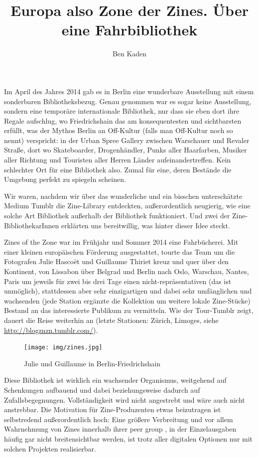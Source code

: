 \documentclass[a4paper,
fontsize=11pt,
oneside,
numbers=noperiodatend,
parskip=half-,
bibliography=totoc,
final
]{scrartcl}
\title{\LARGE{Europa also Zone der Zines. Über eine Fahrbibliothek}} %
\author{Ben Kaden} %
\date{}
\begin{document}
\maketitle
\thispagestyle{fancyplain} 


Im April des Jahres 2014 gab es in Berlin eine wunderbare Ausstellung
mit einem sonderbaren Bibliotheksbezug. Genau genommen war es sogar
keine Ausstellung, sondern eine temporäre internationale Bibliothek, nur
dass sie eben dort ihre Regale aufschlug, wo Friedrichshain das am
konsequentesten und sichtbarsten erfüllt, was der Mythos Berlin an
Off-Kultur (falls man Off-Kultur noch so nennt) verspricht: in der Urban
Spree Gallery zwischen Warschauer und Revaler Straße, dort wo
Skateboarder, Drogenhändler, Punks aller Haarfarben, Musiker aller
Richtung und Touristen aller Herren Länder aufeinandertreffen. Kein
schlechter Ort für eine Bibliothek also. Zumal für eine, deren Bestände
die Umgebung perfekt zu spiegeln scheinen.

Wir waren, nachdem wir über das wunderliche und ein bisschen
unterschätzte Medium Tumblr die Zine-Library entdeckten, außerordentlich
neugierig, wie eine solche Art Bibliothek außerhalb der Bibliothek
funktioniert. Und zwei der Zine-BibliothekarInnen erklärten uns
bereitwillig, was hinter dieser Idee steckt.

Zines of the Zone war im Frühjahr und Sommer 2014 eine Fahrbücherei. Mit
einer kleinen europäischen Förderung ausgestattet, tourte das Team um
die Fotografen Julie Hascoët und Guillaume Thiriet kreuz und quer über
den Kontinent, von Lissabon über Belgrad und Berlin nach Oslo, Warschau,
Nantes, Paris um jeweils für zwei bis drei Tage einen
nicht-repräsentativen (das ist unmöglich), stattdessen aber sehr
einzigartigen und dabei sehr umfänglichen und wachsenden (jede Station
ergänzte die Kollektion um weitere lokale Zine-Stücke) Bestand an das
interessierte Publikum zu vermitteln. Wie der Tour-Tumblr zeigt, dauert
die Reise weiterhin an (letzte Stationen: Zürich, Limoges, siehe
\url{http://blogznzn.tumblr.com/}).

\begin{figure}[htbp]
\centering
\texttt{[image: img/zines.jpg]}
\caption{Julie und Guillaume in Berlin-Friedrichshain}
\end{figure}

Diese Bibliothek ist wirklich ein wachsender Organismus, weitgehend auf
Schenkungen aufbauend und dabei beziehungsweise dadurch auf
Zufallsbegegnungen. Vollständigkeit wird nicht angestrebt und wäre auch
nicht anstrebbar. Die Motivation für Zine-Produzenten etwas beizutragen
ist selbstredend außerordentlich hoch: Eine größere Verbreitung und vor
allem Wahrnehmung von Zines innerhalb ihrer peer group , in der
Einzelausgaben häufig gar nicht breitensichtbar werden, ist trotz aller
digitalen Optionen nur mit solchen Projekten realisierbar.
\end{document}
